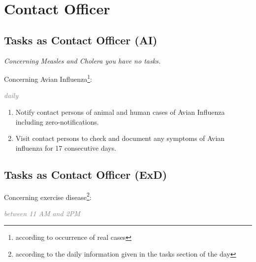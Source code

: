 \documentclass[a4paper, titlepage]{tufte-handout}
\begin{document}
\section{Contact Officer}
\label{sec-5}

\subsection{Tasks as Contact Officer (AI)}
\label{sec-5-1}

\emph{Concerning Measles and Cholera you have no tasks.}

Concerning Avian Influenza\footnote{according to occurrence of real cases}:

\emph{\textcolor{gray}{daily}}

\begin{enumerate}
\item Notify contact persons of animal and human cases of Avian Influenza including zero-notifications.

\item Visit contact persons to check and document any symptoms of Avian influenza for 17 consecutive days.
\end{enumerate}


\subsection{Tasks as Contact Officer (ExD)}
\label{sec-5-2}

Concerning exercise disease\footnote{according to the daily information given in the tasks section of the day}:

\emph{\textcolor{gray}{between 11 AM and 2PM}}
\end{document}

